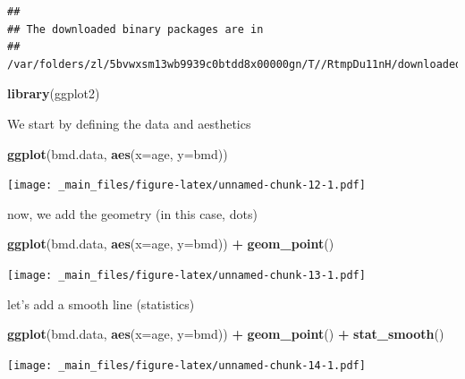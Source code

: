 \documentclass[
]{book}
\newenvironment{Shaded}{\begin{snugshade}}{\end{snugshade}}
\newcommand{\AttributeTok}[1]{\textcolor[rgb]{0.13,0.29,0.53}{#1}}
\newcommand{\FunctionTok}[1]{\textcolor[rgb]{0.13,0.29,0.53}{\textbf{#1}}}
\newcommand{\NormalTok}[1]{#1}
\newcommand{\SpecialCharTok}[1]{\textcolor[rgb]{0.81,0.36,0.00}{\textbf{#1}}}
\begin{document}
\begin{verbatim}
## 
## The downloaded binary packages are in
##  /var/folders/zl/5bvwxsm13wb9939c0btdd8x00000gn/T//RtmpDu11nH/downloaded_packages
\end{verbatim}

\begin{Shaded}
\begin{Highlighting}[]
\FunctionTok{library}\NormalTok{(ggplot2)}
\end{Highlighting}
\end{Shaded}

We start by defining the data and aesthetics

\begin{Shaded}
\begin{Highlighting}[]
\FunctionTok{ggplot}\NormalTok{(bmd.data, }\FunctionTok{aes}\NormalTok{(}\AttributeTok{x=}\NormalTok{age, }\AttributeTok{y=}\NormalTok{bmd)) }
\end{Highlighting}
\end{Shaded}

\texttt{[image: \_main\_files/figure-latex/unnamed-chunk-12-1.pdf]}

now, we add the geometry (in this case, dots)

\begin{Shaded}
\begin{Highlighting}[]
\FunctionTok{ggplot}\NormalTok{(bmd.data, }\FunctionTok{aes}\NormalTok{(}\AttributeTok{x=}\NormalTok{age, }\AttributeTok{y=}\NormalTok{bmd)) }\SpecialCharTok{+} 
        \FunctionTok{geom\_point}\NormalTok{()}
\end{Highlighting}
\end{Shaded}

\texttt{[image: \_main\_files/figure-latex/unnamed-chunk-13-1.pdf]}

let's add a smooth line (statistics)

\begin{Shaded}
\begin{Highlighting}[]
\FunctionTok{ggplot}\NormalTok{(bmd.data, }\FunctionTok{aes}\NormalTok{(}\AttributeTok{x=}\NormalTok{age, }\AttributeTok{y=}\NormalTok{bmd)) }\SpecialCharTok{+} 
        \FunctionTok{geom\_point}\NormalTok{() }\SpecialCharTok{+} 
        \FunctionTok{stat\_smooth}\NormalTok{()  }
\end{Highlighting}
\end{Shaded}

\texttt{[image: \_main\_files/figure-latex/unnamed-chunk-14-1.pdf]}
\end{document}
